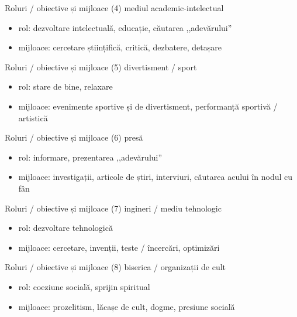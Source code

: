 \documentclass{simple}
\begin{document}
\begin{frame}{Roluri / obiective și mijloace (4)}
  mediul academic-intelectual
  \begin{itemize}
    \pause \item rol: dezvoltare intelectuală, educație, căutarea ,,adevărului''
    \pause \item mijloace: cercetare științifică, critică, dezbatere, detașare
  \end{itemize}
\end{frame}

\begin{frame}{Roluri / obiective și mijloace (5)}
  divertisment / sport
  \begin{itemize}
    \pause \item rol: stare de bine, relaxare
    \pause \item mijloace: evenimente sportive și de divertisment, performanță sportivă / artistică
  \end{itemize}
\end{frame}

\begin{frame}{Roluri / obiective și mijloace (6)}
  presă
  \begin{itemize}
    \pause \item rol: informare, prezentarea ,,adevărului''
    \pause \item mijloace: investigații, articole de știri, interviuri, căutarea acului în nodul cu fân
  \end{itemize}
\end{frame}

\begin{frame}{Roluri / obiective și mijloace (7)}
  ingineri / mediu tehnologic
  \begin{itemize}
    \pause \item rol: dezvoltare tehnologică
    \pause \item mijloace: cercetare, invenții, teste / încercări, optimizări
  \end{itemize}
\end{frame}

\begin{frame}{Roluri / obiective și mijloace (8)}
  biserica / organizații de cult
  \begin{itemize}
    \pause \item rol: coeziune socială, sprijin spiritual
    \pause \item mijloace: prozelitism, lăcașe de cult, dogme, presiune socială
  \end{itemize}
\end{frame}
\end{document}
